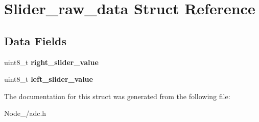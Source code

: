 \hypertarget{structSlider__raw__data}{}\section{Slider\+\_\+raw\+\_\+data Struct Reference}
\label{structSlider__raw__data}
\subsection*{Data Fields}
\begin{DoxyCompactItemize}
\item 
uint8\+\_\+t {\bfseries right\+\_\+slider\+\_\+value}\hypertarget{structSlider__raw__data_ae3a3382a6a70b0faa7202335ac6307b8}{}\label{structSlider__raw__data_ae3a3382a6a70b0faa7202335ac6307b8}

\item 
uint8\+\_\+t {\bfseries left\+\_\+slider\+\_\+value}\hypertarget{structSlider__raw__data_a9bb00f9f2f4367915a738e57ece6c6f9}{}\label{structSlider__raw__data_a9bb00f9f2f4367915a738e57ece6c6f9}

\end{DoxyCompactItemize}


The documentation for this struct was generated from the following file\+:\begin{DoxyCompactItemize}
\item 
Node\+\_/adc.\+h\end{DoxyCompactItemize}

